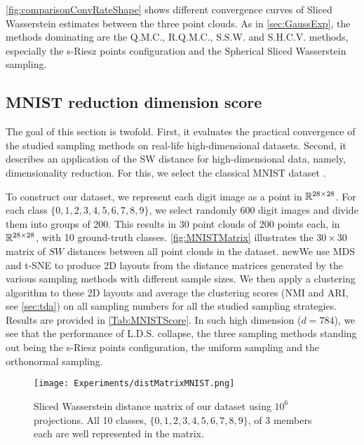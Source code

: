 \autoref{fig:comparisonConvRateShape} shows different convergence curves of 
Sliced Wasserstein estimates between the three point clouds.
As in \autoref{sec:GaussExp}, the methods dominating are the Q.M.C., R.Q.M.C., S.S.W.
and 
{S.H.C.V.}
methods, especially the s-Riesz points configuration {and the Spherical Sliced Wasserstein sampling}.

\subsection{MNIST reduction dimension score} \label{sec:MNIST}

{The goal of this section is {twofold}. 
{First, it evaluates the practical convergence of the studied sampling 
methods on real-life high-dimensional datasets. Second, it describes an 
application of the SW distance for high-dimensional data, namely, 
dimensionality reduction.}
{For this, we select the classical MNIST dataset \citep{lecun1998mnist}.} 
{To construct our dataset, we represent each digit image as a point in 
$\mathbb{R}^{28 \times 28}$. For each class $\lbrace 0,1,2,3,4,5,6,7,8,9\rbrace$, we 
select {randomly} 600 digit images and divide them into groups of 200. This results 
in 30 point clouds {of $200$ points each, in $\mathbb{R}^{28 \times 28}$}, with 
{10 ground-truth classes.}
\autoref{fig:MNISTMatrix} illustrates the {$30\times 30$ matrix of $SW$ distances 
between all point clouds in the dataset}. new{We use MDS and t-SNE to produce 2D 
layouts from the distance matrices generated by the various sampling methods 
with different sample sizes. We then apply a clustering algorithm to these 2D 
layouts and average the clustering scores (NMI and ARI{, see 
\autoref{sec:tda}}) on all sampling numbers for all 
the 
{studied}
sampling strategies.} {Results are provided in \autoref{Tab:MNISTScore}. In such high dimension ($d=784$), we see that the performance of L.D.S. collapse, the three
sampling methods standing out being the s-Riesz points configuration, the uniform 
sampling and the orthonormal sampling}. 
\begin{figure}[h!]
\centering
\texttt{[image: Experiments/distMatrixMNIST.png]}
\caption{Sliced Wasserstein distance matrix of our dataset using $10^6$ projections. All 10 classes, $\{0,1,2,3,4,5,6,7,8,9\}$, of 3 members each are well represented in the matrix.}
\label{fig:MNISTMatrix}
\end{figure}

}}
